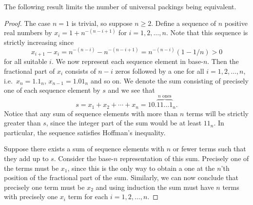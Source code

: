 
\noindent The following result limits the number of universal packings being equivalent.

\begin{proof}
The case $n = 1$ is trivial, so suppose $n \geq 2$. Define a sequence of $n$ positive real numbers by $x_i = 1 + n^{-(n-i+1)}$ for $i = 1, 2, \dotsc, n$. Note that this sequence is strictly increasing since
\[
x_{i+1} - x_i
= n^{-(n-i)} - n^{-(n-i+1)}
= n^{-(n-i)}(1 - 1/n) > 0
\]
for all suitable $i$. We now represent each sequence element in base-$n$. Then the fractional part of $x_i$ consists of $n-i$ zeros followed by a one for all $i = 1, 2, \dotsc, n$, i.e.\ $x_n = 1.1_n$, $x_{n-1} = 1.01_n$ and so on. We denote the sum consisting of precisely one of each sequence element by $s$ and we see that
\[
s = x_1 + x_2 + \dotsb + x_n = 10.\overbrace{11 \dotso 1}^{\text{$n$ ones}}\!{}_n.
\]
Notice that any sum of sequence elements with more than $n$ terms will be strictly greater than $s$, since the integer part of the sum would be at least $11_n$. In particular, the sequence satisfies Hoffman's inequality.

Suppose there exists a sum of sequence elements with $n$ or fewer terms such that they add up to $s$. Consider the base-$n$ representation of this sum. Precisely one of the terms must be $x_1$, since this is the only way to obtain a one at the $n$'th position of the fractional part of the sum. Similarly, we can now conclude that precisely one term must be $x_2$ and using induction the sum must have $n$ terms with precisely one $x_i$ term for each $i = 1, 2, \dotsc, n$.
\end{proof}

